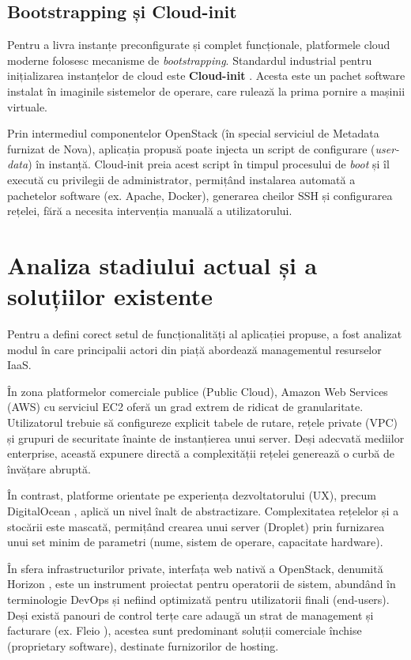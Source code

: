 \subsection{Bootstrapping și Cloud-init}

Pentru a livra instanțe preconfigurate și complet funcționale, platformele cloud moderne folosesc mecanisme de \textit{bootstrapping}. Standardul industrial pentru inițializarea instanțelor de cloud este \textbf{Cloud-init} \cite{cloudinit_docs}. Acesta este un pachet software instalat în imaginile sistemelor de operare, care rulează la prima pornire a mașinii virtuale. 

Prin intermediul componentelor OpenStack (în special serviciul de Metadata furnizat de Nova), aplicația propusă poate injecta un script de configurare (\textit{user-data}) în instanță. Cloud-init preia acest script în timpul procesului de \textit{boot} și îl execută cu privilegii de administrator, permițând instalarea automată a pachetelor software (ex. Apache, Docker), generarea cheilor SSH și configurarea rețelei, fără a necesita intervenția manuală a utilizatorului.

\section{Analiza stadiului actual și a soluțiilor existente}

Pentru a defini corect setul de funcționalități al aplicației propuse, a fost analizat modul în care principalii actori din piață abordează managementul resurselor IaaS.

În zona platformelor comerciale publice (Public Cloud), Amazon Web Services (AWS) cu serviciul EC2 \cite{aws_ec2_docs} oferă un grad extrem de ridicat de granularitate. Utilizatorul trebuie să configureze explicit tabele de rutare, rețele private (VPC) și grupuri de securitate înainte de instanțierea unui server. Deși adecvată mediilor enterprise, această expunere directă a complexității rețelei generează o curbă de învățare abruptă.

În contrast, platforme orientate pe experiența dezvoltatorului (UX), precum DigitalOcean \cite{digitalocean_droplets}, aplică un nivel înalt de abstractizare. Complexitatea rețelelor și a stocării este mascată, permițând crearea unui server (Droplet) prin furnizarea unui set minim de parametri (nume, sistem de operare, capacitate hardware).

În sfera infrastructurilor private, interfața web nativă a OpenStack, denumită Horizon \cite{openstack_horizon}, este un instrument proiectat pentru operatorii de sistem, abundând în terminologie DevOps și nefiind optimizată pentru utilizatorii finali (end-users). Deși există panouri de control terțe care adaugă un strat de management și facturare (ex. Fleio \cite{fleio_docs}), acestea sunt predominant soluții comerciale închise (proprietary software), destinate furnizorilor de hosting.

